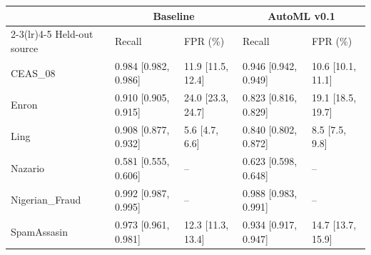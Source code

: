 \begin{tabular}{lllll}
\toprule
& \multicolumn{2}{c}{Baseline} & \multicolumn{2}{c}{AutoML v0.1} \\
\cmidrule(lr){2-3}\cmidrule(lr){4-5}
Held-out source & Recall & FPR (\%) & Recall & FPR (\%) \\
\midrule
CEAS\_08 & 0.984 [0.982, 0.986] & 11.9 [11.5, 12.4] & 0.946 [0.942, 0.949] & 10.6 [10.1, 11.1] \\
Enron & 0.910 [0.905, 0.915] & 24.0 [23.3, 24.7] & 0.823 [0.816, 0.829] & 19.1 [18.5, 19.7] \\
Ling & 0.908 [0.877, 0.932] & 5.6 [4.7, 6.6] & 0.840 [0.802, 0.872] & 8.5 [7.5, 9.8] \\
Nazario & 0.581 [0.555, 0.606] & -- & 0.623 [0.598, 0.648] & -- \\
Nigerian\_Fraud & 0.992 [0.987, 0.995] & -- & 0.988 [0.983, 0.991] & -- \\
SpamAssasin & 0.973 [0.961, 0.981] & 12.3 [11.3, 13.4] & 0.934 [0.917, 0.947] & 14.7 [13.7, 15.9] \\
\bottomrule
\end{tabular}